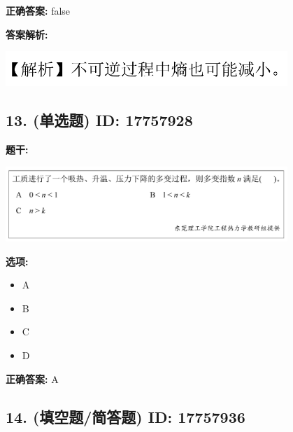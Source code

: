 \documentclass[12pt]{article}
\begin{document}
\textbf{正确答案:}
false

\textbf{答案解析:}


\begin{center}\includegraphics[width=0.8\textwidth, height=0.25\textheight, keepaspectratio]{question_12_17757931/correct_replay_img_1.png}\end{center}

\vspace{0.5em}\hrulefill\vspace{1em}

\subsection*{13. (单选题) \small ID: 17757928}

\textbf{题干:}


\begin{center}\includegraphics[width=0.8\textwidth, height=0.25\textheight, keepaspectratio]{question_13_17757928/title_img_1.png}\end{center}

\textbf{选项:}
\begin{itemize}[leftmargin=*]
  \item A

  \item B

  \item C

  \item D

\end{itemize}

\textbf{正确答案:}
A

\vspace{0.5em}\hrulefill\vspace{1em}

\subsection*{14. (填空题/简答题) \small ID: 17757936}
\end{document}
